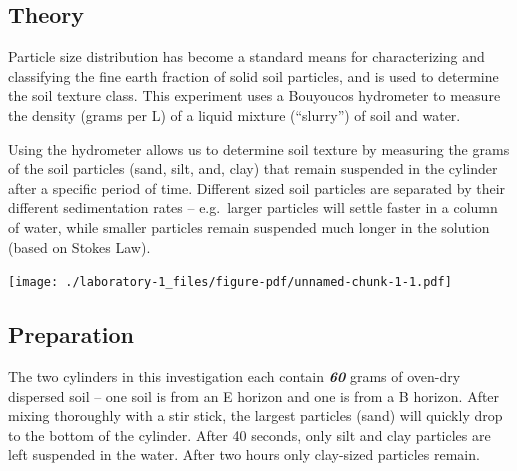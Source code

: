 \documentclass[
  letterpaper,
  DIV=11,
  numbers=noendperiod]{scrreprt}
\begin{document}
\hypertarget{theory}{%
\subsection{Theory}\label{theory}}

Particle size distribution has become a standard means for
characterizing and classifying the fine earth fraction of solid soil
particles, and is used to determine the soil texture class. This
experiment uses a Bouyoucos hydrometer to measure the density (grams per
L) of a liquid mixture (``slurry'') of soil and water.

Using the hydrometer allows us to determine soil texture by measuring
the grams of the soil particles (sand, silt, and, clay) that remain
suspended in the cylinder after a specific period of time. Different
sized soil particles are separated by their different sedimentation
rates -- e.g.~larger particles will settle faster in a column of water,
while smaller particles remain suspended much longer in the solution
(based on Stokes Law).

\begin{tcolorbox}[enhanced jigsaw, opacityback=0, titlerule=0mm, bottomtitle=1mm, breakable, title=\textcolor{quarto-callout-note-color}{\faInfo}\hspace{0.5em}{Watch this video before you start Investigation A}, left=2mm, toptitle=1mm, opacitybacktitle=0.6, coltitle=black, arc=.35mm, leftrule=.75mm, colbacktitle=quarto-callout-note-color!10!white, rightrule=.15mm, toprule=.15mm, bottomrule=.15mm, colframe=quarto-callout-note-color-frame, colback=white]

\texttt{[image: ./laboratory-1\_files/figure-pdf/unnamed-chunk-1-1.pdf]}

\end{tcolorbox}

\hypertarget{preparation}{%
\subsection{Preparation}\label{preparation}}

The two cylinders in this investigation each contain \textbf{\emph{60}}
grams of oven-dry dispersed soil -- one soil is from an E horizon and
one is from a B horizon. After mixing thoroughly with a stir stick, the
largest particles (sand) will quickly drop to the bottom of the
cylinder. After 40 seconds, only silt and clay particles are left
suspended in the water. After two hours only clay-sized particles
remain.
\end{document}
